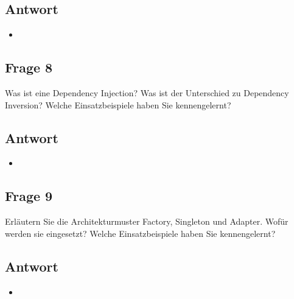 \subsection*{Antwort}
\begin{itemize}
	\item 
\end{itemize}

\subsection*{Frage 8}
Was ist eine Dependency Injection? Was ist der Unterschied zu Dependency Inversion? Welche Einsatzbeispiele haben Sie kennengelernt?
\subsection*{Antwort}
\begin{itemize}
	\item 
\end{itemize}

\subsection*{Frage 9}
Erläutern Sie die Architekturmuster Factory, Singleton und Adapter. Wofür werden sie eingesetzt? Welche Einsatzbeispiele haben Sie kennengelernt?
\subsection*{Antwort}
\begin{itemize}
	\item 
\end{itemize}
